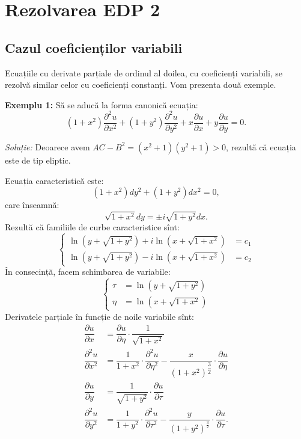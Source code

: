 
\chapter{Rezolvarea EDP 2}

\section{Cazul coeficienților variabili}

\indent\indent Ecuațiile cu derivate parțiale de ordinul al doilea, cu coeficienți variabili,
se rezolvă similar celor cu coeficienți constanți. Vom prezenta două exemple.

\textbf{Exemplu 1:} Să se aducă la forma canonică ecuația:
\[
    (1 + x^2)\dfrac{\partial^2 u}{\partial x^2} + %
    (1 + y^2)\dfrac{\partial^2 u}{\partial y^2} + %
    x \dfrac{\partial u}{\partial x} + y \dfrac{\partial u}{\partial y} = 0.
\]

\emph{Soluție:} Deoarece avem $ AC - B^2 = (x^2 + 1)(y^2 + 1) > 0 $, rezultă
că ecuația este de tip eliptic.

Ecuația caracteristică este:
\[
    (1 + x^2)dy^2 + (1 + y^2) dx^2 = 0,
\]
care înseamnă:
\[
    \sqrt{1 + x^2} dy = \pm i \sqrt{1 + y^2} dx.
\]
Rezultă că familiile de curbe caracteristice sînt:
\[
    \begin{cases}
        \ln(y + \sqrt{1 + y^2}) + i \ln(x + \sqrt{1 + x^2}) &= c_1 \\
        \ln(y + \sqrt{1 + y^2}) - i \ln(x + \sqrt{1 + x^2}) &= c_2
    \end{cases}
\]
În consecință, facem schimbarea de variabile:
\[
    \begin{cases}
        \tau &= \ln(y + \sqrt{1 + y^2}) \\
        \eta &= \ln(x + \sqrt{1 + x^2})
    \end{cases}
\]
Derivatele parțiale în funcție de noile variabile sînt:
\begin{align*}
    \dfrac{\partial u}{\partial x} &= \dfrac{\partial u}{\partial \eta} \cdot %
    \dfrac{1}{\sqrt{1 + x^2}} \\
    \dfrac{\partial^2 u}{\partial x^2} &= \dfrac{1}{1 + x^2} \cdot \dfrac{\partial^2 u}{\partial \eta^2}%
    - \dfrac{x}{(1 + x^2)^{\dfrac{3}{2}}} \cdot %
    \dfrac{\partial u}{\partial \eta} \\
    \dfrac{\partial u}{\partial y} &= \dfrac{1}{\sqrt{1 + y^2}} \cdot \dfrac{\partial u}{\partial \tau} \\
    \dfrac{\partial^2 u}{\partial y^2} &= \dfrac{1}{1 + y^2} \cdot \dfrac{\partial^2 u}{\partial \tau^2}%
    - \dfrac{y}{(1 + y^2)^{\frac{3}{2}}} \cdot %
    \dfrac{\partial u}{\partial \tau}.
\end{align*}

